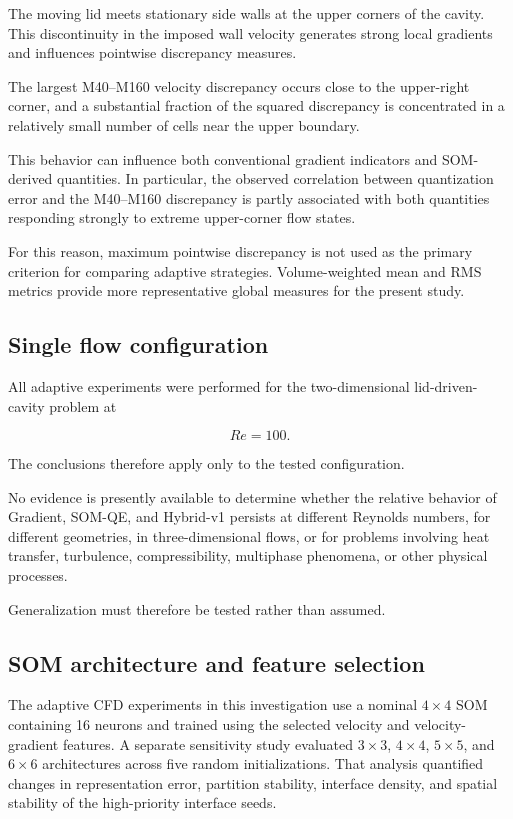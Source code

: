 The moving lid meets stationary side walls at the upper corners of the
cavity. This discontinuity in the imposed wall velocity generates strong
local gradients and influences pointwise discrepancy measures.

The largest M40--M160 velocity discrepancy occurs close to the upper-right
corner, and a substantial fraction of the squared discrepancy is
concentrated in a relatively small number of cells near the upper boundary.

This behavior can influence both conventional gradient indicators and
SOM-derived quantities. In particular, the observed correlation between
quantization error and the M40--M160 discrepancy is partly associated with
both quantities responding strongly to extreme upper-corner flow states.

For this reason, maximum pointwise discrepancy is not used as the primary
criterion for comparing adaptive strategies. Volume-weighted mean and RMS
metrics provide more representative global measures for the present study.

\subsection{Single flow configuration}

All adaptive experiments were performed for the two-dimensional
lid-driven-cavity problem at

\begin{equation}
Re=100.
\end{equation}

The conclusions therefore apply only to the tested configuration.

No evidence is presently available to determine whether the relative
behavior of Gradient, SOM-QE, and Hybrid-v1 persists at different Reynolds
numbers, for different geometries, in three-dimensional flows, or for
problems involving heat transfer, turbulence, compressibility, multiphase
phenomena, or other physical processes.

Generalization must therefore be tested rather than assumed.

\subsection{SOM architecture and feature selection}

The adaptive CFD experiments in this investigation use a nominal
\(4\times4\) SOM containing 16 neurons and trained using the selected
velocity and velocity-gradient features. A separate sensitivity study
evaluated \(3\times3\), \(4\times4\), \(5\times5\), and \(6\times6\)
architectures across five random initializations. That analysis quantified
changes in representation error, partition stability, interface density,
and spatial stability of the high-priority interface seeds.

